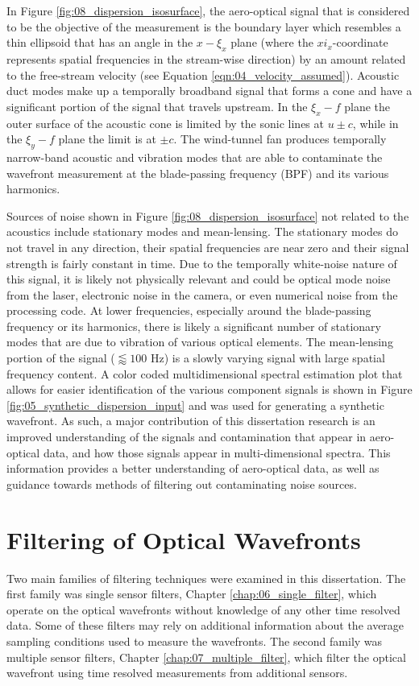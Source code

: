 In Figure \ref{fig:08_dispersion_isosurface}, the aero-optical signal that is considered to be the objective of the measurement is the boundary layer which resembles a thin ellipsoid that has an angle in the $x-\xi_x$ plane (where the $xi_x$-coordinate represents spatial frequencies in the stream-wise direction) by an amount related to the free-stream velocity (see Equation \ref{eqn:04_velocity_assumed}).
Acoustic duct modes make up a temporally broadband signal that forms a cone and have a significant portion of the signal that travels upstream.
In the $\xi_x-f$ plane the outer surface of the acoustic cone is limited by the sonic lines at $u\pm c$, while in the $\xi_y-f$ plane the limit is at $\pm c$.
The wind-tunnel fan produces temporally narrow-band acoustic and vibration modes that are able to contaminate the wavefront measurement at the blade-passing frequency (BPF) and its various harmonics.

Sources of noise shown in Figure \ref{fig:08_dispersion_isosurface} not related to the acoustics include stationary modes and mean-lensing.
The stationary modes do not travel in any direction, their spatial frequencies are near zero and their signal strength is fairly constant in time.
Due to the temporally white-noise nature of this signal, it is likely not physically relevant and could be optical mode noise from the laser, electronic noise in the camera, or even numerical noise from the processing code.
At lower frequencies, especially around the blade-passing frequency or its harmonics, there is likely a significant number of stationary modes that are due to vibration of various optical elements.
The mean-lensing portion of the signal ($\lessapprox 100$ Hz) is a slowly varying signal with large spatial frequency content.
A color coded multidimensional spectral estimation plot that allows for easier identification of the various component signals is shown in Figure \ref{fig:05_synthetic_dispersion_input} and was used for generating a synthetic wavefront.
As such, a major contribution of this dissertation research is an improved understanding of the signals and contamination that appear in aero-optical data, and how those signals appear in multi-dimensional spectra. This information provides a better understanding of aero-optical data, as well as guidance towards methods of filtering out contaminating noise sources.

\section{Filtering of Optical Wavefronts}
Two main families of filtering techniques were examined in this dissertation.
The first family was single sensor filters, Chapter \ref{chap:06_single_filter}, which operate on the optical wavefronts without knowledge of any other time resolved data.
Some of these filters may rely on additional information about the average sampling conditions used to measure the wavefronts.
The second family was multiple sensor filters, Chapter \ref{chap:07_multiple_filter}, which filter the optical wavefront using time resolved measurements from additional sensors.

